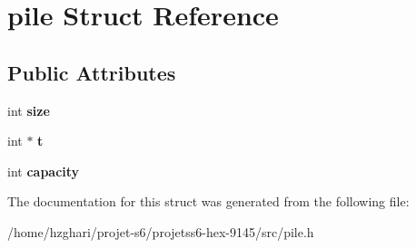 \hypertarget{structpile}{}\section{pile Struct Reference}
\label{structpile}
\subsection*{Public Attributes}
\begin{DoxyCompactItemize}
\item 
\mbox{\label{structpile_a7aedb8dc1364675795d5fa49415db8c5}} 
int {\bfseries size}
\item 
\mbox{\label{structpile_af43a0b1a68b51e652e2fc7415eb4a088}} 
int $\ast$ {\bfseries t}
\item 
\mbox{\label{structpile_a7177775371a9e73389caca7f8ea7ba7b}} 
int {\bfseries capacity}
\end{DoxyCompactItemize}


The documentation for this struct was generated from the following file\+:\begin{DoxyCompactItemize}
\item 
/home/hzghari/projet-\/s6/projetss6-\/hex-\/9145/src/pile.\+h\end{DoxyCompactItemize}
